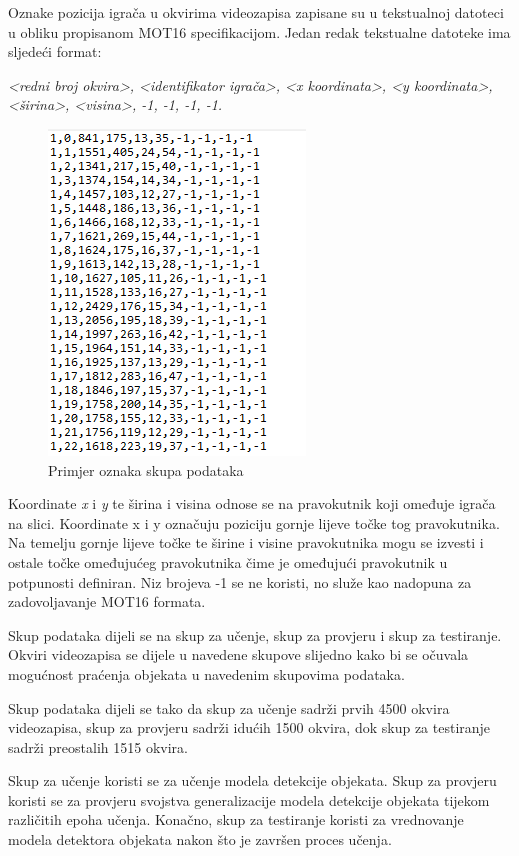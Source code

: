 \documentclass[times, utf8, seminar, numeric]{fer}
\begin{document}
Oznake pozicija igrača u okvirima videozapisa zapisane su u tekstualnoj datoteci u obliku propisanom MOT16 specifikacijom. Jedan redak tekstualne datoteke ima sljedeći format:

\textit{<redni broj okvira>, <identifikator igrača>, <x koordinata>, <y koordinata>, <širina>, <visina>, -1, -1, -1, -1.}


\begin{figure}
	\centering
	\includegraphics[scale=0.8]{slike/oznake.png}
	\caption {Primjer oznaka skupa podataka}
	\label{fig:oznake}	
\end{figure}



Koordinate \textit{x} i \textit{y} te širina i visina odnose se na pravokutnik koji omeđuje igrača na slici. Koordinate x i y označuju poziciju gornje lijeve točke tog pravokutnika. Na temelju gornje lijeve točke te širine i visine pravokutnika mogu se izvesti i ostale točke omeđujućeg pravokutnika čime je omeđujući pravokutnik u potpunosti definiran.
Niz brojeva -1 se ne koristi, no služe kao nadopuna za zadovoljavanje MOT16 formata.

Skup podataka dijeli se na skup za učenje, skup za provjeru i skup za testiranje. 
Okviri videozapisa se dijele u navedene skupove slijedno kako bi se očuvala mogućnost praćenja objekata u navedenim skupovima podataka. 

Skup podataka dijeli se tako da skup za učenje sadrži prvih 4500 okvira videozapisa, skup za provjeru sadrži idućih 1500 okvira, dok skup za testiranje sadrži preostalih 1515 okvira. 

Skup za učenje koristi se za učenje modela detekcije objekata. 
Skup za provjeru koristi se za provjeru svojstva generalizacije modela detekcije objekata tijekom različitih epoha učenja. 
Konačno, skup za testiranje koristi za vrednovanje modela detektora objekata nakon što je završen proces učenja. 
\end{document}
